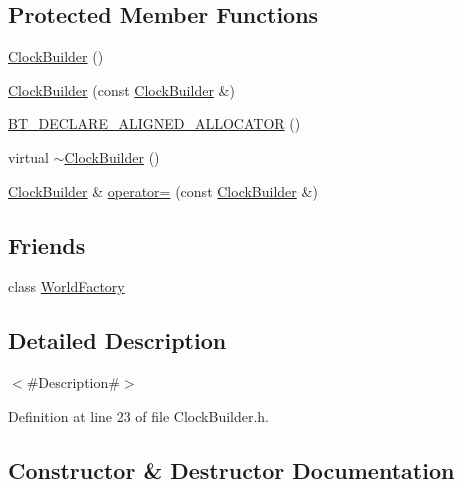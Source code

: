 \subsection*{Protected Member Functions}
\begin{DoxyCompactItemize}
\item 
\mbox{\hyperlink{classnjli_1_1_clock_builder_a252dbc5874f31103b041b5d9b19d9b00}{Clock\+Builder}} ()
\item 
\mbox{\hyperlink{classnjli_1_1_clock_builder_a1ba284d73c87e086394b6dbeb4b6cf17}{Clock\+Builder}} (const \mbox{\hyperlink{classnjli_1_1_clock_builder}{Clock\+Builder}} \&)
\item 
\mbox{\hyperlink{classnjli_1_1_clock_builder_a9cba8993e2e7b2aeed39039d46b589f9}{B\+T\+\_\+\+D\+E\+C\+L\+A\+R\+E\+\_\+\+A\+L\+I\+G\+N\+E\+D\+\_\+\+A\+L\+L\+O\+C\+A\+T\+OR}} ()
\item 
virtual \mbox{\hyperlink{classnjli_1_1_clock_builder_acf7d6ba1bfbe6e4b17893b16a0703e50}{$\sim$\+Clock\+Builder}} ()
\item 
\mbox{\hyperlink{classnjli_1_1_clock_builder}{Clock\+Builder}} \& \mbox{\hyperlink{classnjli_1_1_clock_builder_af528ee817dd44638a10c78227290337e}{operator=}} (const \mbox{\hyperlink{classnjli_1_1_clock_builder}{Clock\+Builder}} \&)
\end{DoxyCompactItemize}
\subsection*{Friends}
\begin{DoxyCompactItemize}
\item 
class \mbox{\hyperlink{classnjli_1_1_clock_builder_acb96ebb09abe8f2a37a915a842babfac}{World\+Factory}}
\end{DoxyCompactItemize}


\subsection{Detailed Description}
$<$\#\+Description\#$>$ 

Definition at line 23 of file Clock\+Builder.\+h.



\subsection{Constructor \& Destructor Documentation}
\mbox{\label{classnjli_1_1_clock_builder_a252dbc5874f31103b041b5d9b19d9b00}} 
